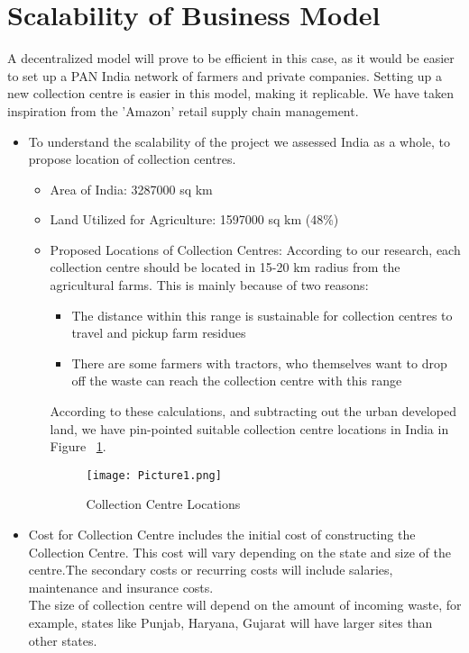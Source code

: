 \documentclass[conference]{IEEEtran}
\begin{document}
\section{Scalability of Business Model}
A decentralized model will prove to be efficient in this case, as it would be easier to set up a PAN India network of farmers and private companies. Setting up a new collection centre is easier in this model, making it replicable. We have taken inspiration from the 'Amazon' retail supply chain management. \\
\begin{itemize}
    \item To understand the scalability of the project we assessed India as a whole, to propose location of collection centres. 
\begin{itemize}
    \item Area of India: 3287000 sq km 
    \item Land Utilized for Agriculture: 1597000 sq km (48\%)
    \item Proposed Locations of Collection Centres: According to our research, each collection centre should be located in 15-20 km radius from the agricultural farms. This is mainly because of two reasons: 
    \begin{itemize} 
        \item The distance within this range is sustainable for collection centres to travel and pickup farm residues 
        \item There are some farmers with tractors, who themselves want to drop off the waste can reach the collection centre with this range 
    \end{itemize}
    According to these calculations, and subtracting out the urban developed land, we have pin-pointed suitable collection centre locations in India in Figure ~\ref{fig:7}. 
    \begin{figure}[htbp]
\centerline{\texttt{[image: Picture1.png]}}
\caption{Collection Centre Locations}
\label{fig:7}
\end{figure}
\end{itemize}
\item Cost for Collection Centre includes the initial cost of constructing the Collection Centre. This cost will vary depending on the state and size of the centre.The secondary costs or recurring costs will include salaries, maintenance and insurance costs. \\
 The size of collection centre will depend on the amount of incoming waste, for example, states like Punjab, Haryana, Gujarat will have larger sites than other states. \\

\end{itemize}
\end{document}
